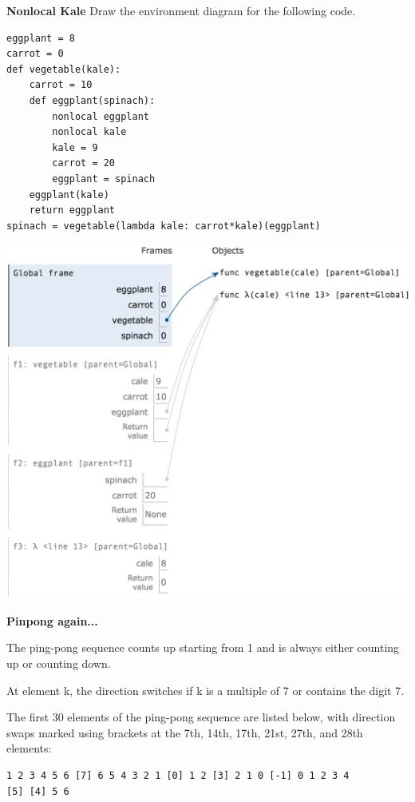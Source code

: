 \documentclass{exam}
\begin{document}
\begin{questions}

\begin{blocksection}
\question \textbf{Nonlocal Kale} \newline
Draw the environment diagram for the following code.

\begin{lstlisting}
eggplant = 8
carrot = 0
def vegetable(kale):
    carrot = 10
    def eggplant(spinach):
        nonlocal eggplant
        nonlocal kale
        kale = 9
        carrot = 20
        eggplant = spinach
    eggplant(kale)
    return eggplant
spinach = vegetable(lambda kale: carrot*kale)(eggplant)
\end{lstlisting}

\begin{solution}[3in]
    \includegraphics[scale=0.5]{img/kale.png}
\end{solution}

\end{blocksection}

\begin{blocksection}
\question \textbf{Pinpong again...}\\
\begin{nonsol}
The ping-pong sequence counts up starting from 1 and is
always either counting up or counting down.

At element k, the direction switches if k is a multiple of 7 or contains the
digit 7.

The first 30 elements of the ping-pong sequence are listed below, with direction
swaps marked using brackets at the 7th, 14th, 17th, 21st, 27th, and 28th
elements:
\begin{lstlisting}
1 2 3 4 5 6 [7] 6 5 4 3 2 1 [0] 1 2 [3] 2 1 0 [-1] 0 1 2 3 4
[5] [4] 5 6
\end{lstlisting}
\end{nonsol}


\end{blocksection}
\end{questions}
\end{document}
